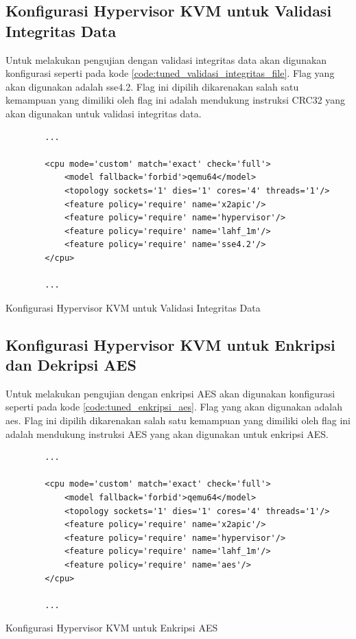 \subsection{Konfigurasi Hypervisor KVM untuk Validasi Integritas Data}
Untuk melakukan pengujian dengan validasi integritas data akan digunakan konfigurasi seperti pada kode \ref{code:tuned_validasi_integritas_file}. Flag yang akan digunakan adalah sse4.2. Flag ini dipilih dikarenakan salah satu kemampuan yang dimiliki oleh flag ini adalah mendukung instruksi CRC32 yang akan digunakan untuk validasi integritas data.

\begin{listing}[H]
    \begin{verbatim}
        ...

        <cpu mode='custom' match='exact' check='full'>
            <model fallback='forbid'>qemu64</model>
            <topology sockets='1' dies='1' cores='4' threads='1'/>
            <feature policy='require' name='x2apic'/>
            <feature policy='require' name='hypervisor'/> 
            <feature policy='require' name='lahf_1m'/>
            <feature policy='require' name='sse4.2'/>
        </cpu>
        
        ...
    \end{verbatim}
    \caption{Konfigurasi Hypervisor KVM untuk Validasi Integritas Data}
    \label{code:tuned_validasi_integritas_file}
\end{listing}

\subsection{Konfigurasi Hypervisor KVM untuk Enkripsi dan Dekripsi AES}
Untuk melakukan pengujian dengan enkripsi AES akan digunakan konfigurasi seperti pada kode \ref{code:tuned_enkripsi_aes}. Flag yang akan digunakan adalah aes. Flag ini dipilih dikarenakan salah satu kemampuan yang dimiliki oleh flag ini adalah mendukung instruksi AES yang akan digunakan untuk enkripsi AES.

\begin{listing}[H]
    \begin{verbatim}
        ...

        <cpu mode='custom' match='exact' check='full'>
            <model fallback='forbid'>qemu64</model>
            <topology sockets='1' dies='1' cores='4' threads='1'/>
            <feature policy='require' name='x2apic'/>
            <feature policy='require' name='hypervisor'/> 
            <feature policy='require' name='lahf_1m'/>
            <feature policy='require' name='aes'/>
        </cpu>
        
        ...
    \end{verbatim}
    \caption{Konfigurasi Hypervisor KVM untuk Enkripsi AES}
    \label{code:tuned_enkripsi_aes}
\end{listing}

